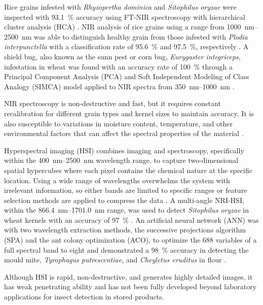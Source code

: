 \documentclass[../Vibro-Acoustic Signatures and Detection Algorithms for Stored Product Insects.tex]{subfiles}
\begin{document}
Rice grains infested with \textit{Rhyzopertha dominica} and \textit{Sitophilus oryzae} were inspected with \SI{93.1}{\percent} accuracy using FT-NIR spectroscopy with hierarchical cluster analysis (HCA) \cite{srivastavaFuzzyControllerBased2019}. NIR analysis of rice grains using a range from \SIrange{1000}{2500}{\nano\meter} was able to distinguish healthy grain from those infested with \textit{Plodia interpunctella} with a classification rate of \SI{95.6}{\percent} and \SI{97.5}{\percent}, respectively \cite{biancolilloDeterminationInsectInfestation2019}. A shield bug, also known as the sunn pest or corn bug, \textit{Eurygaster integriceps}, infestation in wheat was found with an accuracy rate of \SI{100}{\percent} through a Principal Component Analysis (PCA) and Soft Independent Modeling of Class Analogy (SIMCA) model applied to NIR spectra from \SIrange{350}{1000}{\nano\meter} \cite{basatiDetectionSunnPestdamaged2018}.

NIR spectroscopy is non-destructive and fast, but it requires constant recalibration for different grain types and kernel sizes to maintain accuracy. It is also susceptible to variations in moisture content, temperature, and other environmental factors that can affect the spectral properties of the material \cite{neethirajanDetectionTechniquesStoredProduct2007}.

Hyperspectral imaging (HSI) combines imaging and spectroscopy, specifically within the \SIrange{400}{2500}{\nano\meter} wavelength range, to capture two-dimensional spatial hypercubes where each pixel contains the chemical nature at the specific location. Using a wide range of wavelengths overwhelms the system with irrelevant information, so either bands are limited to specific ranges or feature selection methods are applied to compress the data \cite{chenHyperspectralReflectanceImaging2018}. A multi-angle NRI-HSI, within the \SIrange{866.4}{1701.0}{\nano\meter} range, was used to detect \textit{Sitophilus oryzae} in wheat kernels with an accuracy of \SI{97}{\percent} \cite{zhangIdentificationRiceweevilSitophilus2021}. An artificial neural network (ANN) was with two wavelength extraction methods, the successive projections algorithm (SPA) and the ant colony optimization (ACO), to optimize the 688 variables of a full spectral band to eight and demonstrated a \SI{98}{\percent} accuracy in detecting the mould mite, \textit{Tyrophagus putrescentiae}, and \textit{Cheyletus eruditus} in flour \cite{heDetectionMitesTyrophagus2020}.

Although HSI is rapid, non-destructive, and generates highly detailed images, it has weak penetrating ability and has not been fully developed beyond laboratory applications for insect detection in stored products.
\end{document}
